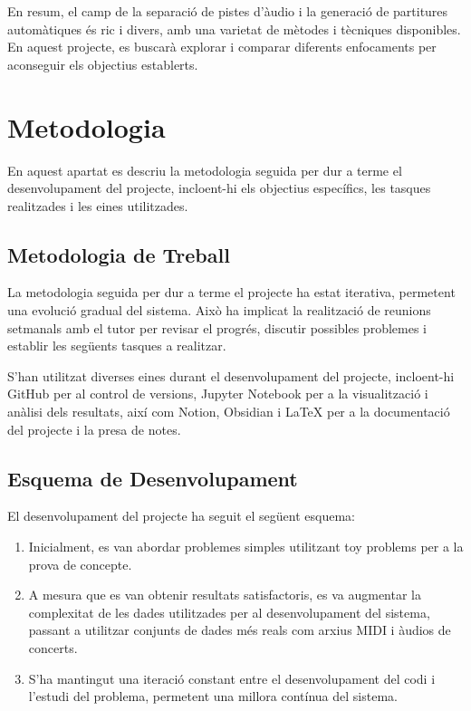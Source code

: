 \documentclass[10pt,a4paper,twocolumn,twoside]{article}
\begin{document}
En resum, el camp de la separació de pistes d'àudio i la generació de partitures automàtiques és ric i divers, amb una varietat de mètodes i tècniques disponibles. En aquest projecte, es buscarà explorar i comparar diferents enfocaments per aconseguir els objectius establerts.


\section{Metodologia}
\label{sec:metodologia}

En aquest apartat es descriu la metodologia seguida per dur a terme el desenvolupament del projecte, incloent-hi els objectius específics, les tasques realitzades i les eines utilitzades.


\subsection{Metodologia de Treball}
\label{subsec-metodologia}

La metodologia seguida per dur a terme el projecte ha estat iterativa, permetent una evolució gradual del sistema. Això ha implicat la realització de reunions setmanals amb el tutor per revisar el progrés, discutir possibles problemes i establir les següents tasques a realitzar.

S'han utilitzat diverses eines durant el desenvolupament del projecte, incloent-hi GitHub per al control de versions, Jupyter Notebook per a la visualització i anàlisi dels resultats, així com Notion, Obsidian i LaTeX per a la documentació del projecte i la presa de notes.

\subsection{Esquema de Desenvolupament}
\label{subsec-esquema-desenvolupament}

El desenvolupament del projecte ha seguit el següent esquema:

\begin{enumerate}
    \item Inicialment, es van abordar problemes simples utilitzant toy problems per a la prova de concepte.
    \item A mesura que es van obtenir resultats satisfactoris, es va augmentar la complexitat de les dades utilitzades per al desenvolupament del sistema, passant a utilitzar conjunts de dades més reals com arxius MIDI i àudios de concerts.
    \item S'ha mantingut una iteració constant entre el desenvolupament del codi i l'estudi del problema, permetent una millora contínua del sistema.
\end{enumerate}
\end{document}
